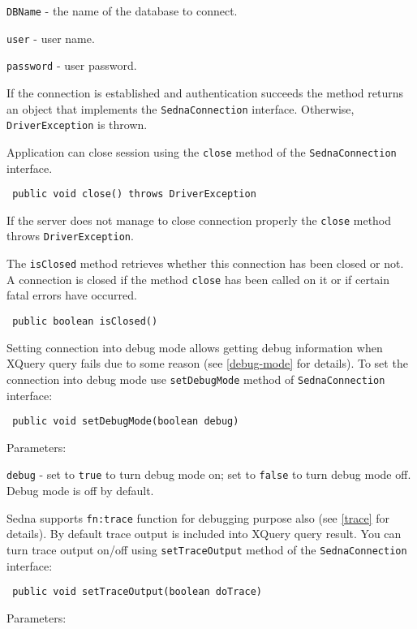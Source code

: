 \documentclass[a4paper,12pt]{article}
\begin{document}
\verb!DBName! - the name of the database to connect.

\verb!user! - user name.

\verb!password! - user password.

If the connection is established and authentication succeeds the method returns
an object that implements the \verb!SednaConnection! interface. Otherwise,
\verb!DriverException! is thrown.

Application can close session using the \verb!close! method of the
\verb!SednaConnection! interface.

\begin{verbatim}
 public void close() throws DriverException
\end{verbatim}

If the server does not manage to close connection properly the \verb!close!
method throws \verb!DriverException!.

The \verb!isClosed! method retrieves whether this connection has been closed or
not. A connection is closed if the method \verb!close! has been called on it or
if certain fatal errors have occurred.

\begin{verbatim}
 public boolean isClosed()
\end{verbatim}

Setting connection into debug mode allows getting debug information when XQuery
query fails due to some reason (see \ref{debug-mode} for details). To set the
connection into debug mode use \verb!setDebugMode! method of
\verb!SednaConnection! interface:

\begin{verbatim}
 public void setDebugMode(boolean debug)
\end{verbatim}

Parameters:

\verb!debug! - set to \verb!true! to turn debug mode on; set to \verb!false! to
turn debug mode off. Debug mode is off by default.

Sedna supports \verb!fn:trace! function for debugging purpose also (see
\ref{trace} for details). By default trace output is included into XQuery query
result. You can turn trace output on/off using \verb!setTraceOutput! method of
the \verb!SednaConnection! interface:

\begin{verbatim}
 public void setTraceOutput(boolean doTrace)
\end{verbatim}

Parameters:
\end{document}
